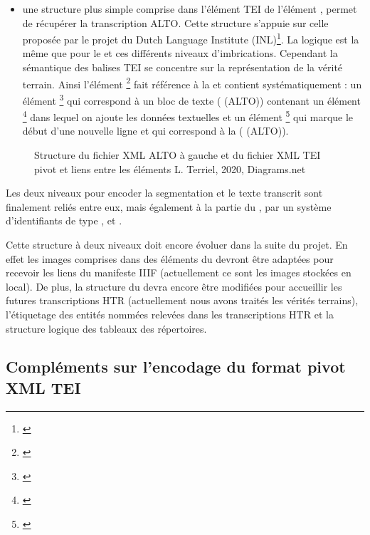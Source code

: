 \begin{itemize}
    \item une structure plus simple comprise dans l'élément TEI  de l'élément , permet de récupérer la transcription ALTO. Cette structure s'appuie sur celle proposée par le projet du Dutch Language Institute (INL)\footnote{\cite{dutch_language_institute_alto2tei_nodate}}. La logique est la même que pour le  et ces différents niveaux d'imbrications. Cependant la sémantique des balises TEI se concentre sur la représentation de la vérité terrain. Ainsi l'élément \footnote{\cite{tei_tei_nodate-11}} fait référence à la  et contient systématiquement : un élément \footnote{\cite{tei_tei_nodate-10}} qui correspond à un bloc de texte ( (ALTO)) contenant un élément \footnote{\cite{tei_tei_nodate-24}} dans lequel on ajoute les données textuelles et un élément \footnote{\cite{tei_tei_nodate-25}} qui marque le début d'une nouvelle ligne et qui correspond à la ( (ALTO)).
\end{itemize}

\begin{figure}[h]
    \centering
    \centerline{}
    \caption{Structure du fichier XML ALTO à gauche et du fichier XML TEI pivot et liens entre les éléments \textcopyright L. Terriel, 2020, Diagrams.net}
    \label{fig:structure_arbre_tei_alto}
\end{figure}
\bigskip
Les deux niveaux pour encoder la segmentation et le texte transcrit sont finalement reliés entre eux, mais également à la partie du , par un système d'identifiants de type ,  et .

Cette structure à deux niveaux doit encore évoluer dans la suite du projet. En effet les images comprises dans des éléments  du  devront être adaptées pour recevoir les liens du manifeste IIIF (actuellement ce sont les images stockées en local). De plus, la structure du  devra encore être modifiées pour accueillir les futures transcriptions HTR (actuellement nous avons traités les vérités terrains), l'étiquetage des entités nommées relevées dans les transcriptions HTR et la structure logique des tableaux des répertoires.

\subsection{Compléments sur l'encodage du format pivot XML TEI}

